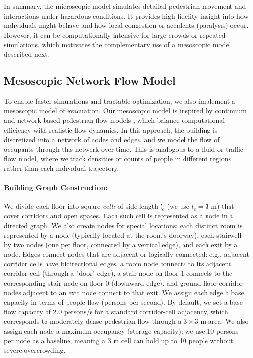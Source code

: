 \documentclass[11pt,a4paper]{article}
\begin{document}
In summary, the microscopic model simulates detailed pedestrian movement and interactions under hazardous conditions. It provides high-fidelity insight into how individuals might behave and how local congestion or accidents (paralysis) occur. However, it can be computationally intensive for large crowds or repeated simulations, which motivates the complementary use of a mesoscopic model described next.

\subsection{Mesoscopic Network Flow Model}
To enable faster simulations and tractable optimization, we also implement a mesoscopic model of evacuation. Our mesoscopic model is inspired by continuum and network-based pedestrian flow models \cite{Hoogendoorn2003,Treuille2006}, which balance computational efficiency with realistic flow dynamics. In this approach, the building is discretized into a network of nodes and edges, and we model the flow of occupants through this network over time. This is analogous to a fluid or traffic flow model, where we track densities or counts of people in different regions rather than each individual trajectory.

\paragraph{Building Graph Construction:} We divide each floor into square \textit{cells} of side length $l_c$ (we use $l_c=3$ m) that cover corridors and open spaces. Each such cell is represented as a node in a directed graph. We also create nodes for special locations: each distinct room is represented by a node (typically located at the room's doorway), each stairwell by two nodes (one per floor, connected by a vertical edge), and each exit by a node. Edges connect nodes that are adjacent or logically connected: e.g., adjacent corridor cells have bidirectional edges, a room node connects to its adjacent corridor cell (through a "door" edge), a stair node on floor 1 connects to the corresponding stair node on floor 0 (downward edge), and ground-floor corridor nodes adjacent to an exit node connect to that exit. We assign each edge a base capacity in terms of people flow (persons per second). By default, we set a base flow capacity of $2.0$ persons/s for a standard corridor-cell adjacency, which corresponds to moderately dense pedestrian flow through a $3\times3$ m area. We also assign each node a maximum occupancy (storage capacity); we use 10 persons per node as a baseline, meaning a 3 m cell can hold up to 10 people without severe overcrowding.
\end{document}
